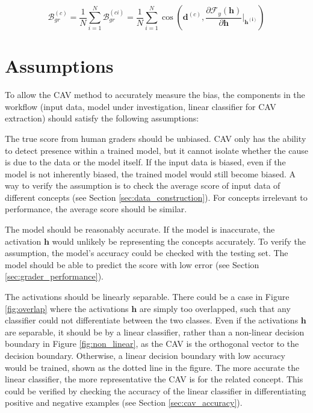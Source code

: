 \begin{equation} \label{eq:grad_gr}
    \mathcal{B}^{(c)}_{gr} = \frac{1}{N} \sum_{i=1}^{N} \mathcal{B}^{(ci)}_{gr} = \frac{1}{N} \sum_{i=1}^{N}\cos\left(\boldsymbol{d}^{(c)}, \frac{\partial \mathcal{F}_y(\boldsymbol{h})}{\partial \boldsymbol{h}}\vert_{\boldsymbol{h^{(i)}}} \right)
\end{equation}

\section{Assumptions}
To allow the CAV method to accurately measure the bias, the components in the workflow (input data, model under investigation, linear classifier for CAV extraction) should satisfy the following assumptions:

The true score from human graders should be unbiased. CAV only has the ability to detect presence within a trained model, but it cannot isolate whether the cause is due to the data or the model itself. If the input data is biased, even if the model is not inherently biased, the trained model would still become biased. A way to verify the assumption is to check the average score of input data of different concepts (see Section \ref{sec:data_construction}). For concepts irrelevant to performance, the average score should be similar.

The model should be reasonably accurate. If the model is inaccurate, the activation $\boldsymbol{h}$ would unlikely be representing the concepts accurately. To verify the assumption, the model's accuracy could be checked with the testing set. The model should be able to predict the score with low error (see Section \ref{sec:grader_performance}).

The activations should be linearly separable. There could be a case in Figure \ref{fig:overlap} where the activations $\boldsymbol{h}$ are simply too overlapped, such that any classifier could not differentiate between the two classes. Even if the activations $\boldsymbol{h}$ are separable, it should be by a linear classifier, rather than a non-linear decision boundary in Figure \ref{fig:non_linear}, as the CAV is the orthogonal vector to the decision boundary. Otherwise, a linear decision boundary with low accuracy would be trained, shown as the dotted line in the figure. The more accurate the linear classifier, the more representative the CAV is for the related concept. This could be verified by checking the accuracy of the linear classifier in differentiating positive and negative examples (see Section \ref{sec:cav_accuracy}).

